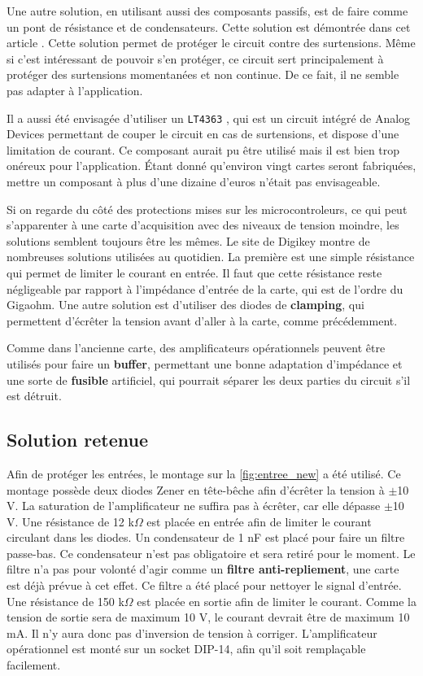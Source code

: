 \documentclass{report}
\begin{document}
Une autre solution, en utilisant aussi des composants passifs, est de faire comme un pont de résistance et de condensateurs. Cette solution est démontrée dans cet article \cite{FilipovaPetrakieva2020}. Cette solution permet de protéger le circuit contre des surtensions. Même si c'est intéressant de pouvoir s'en protéger, ce circuit sert principalement à protéger des surtensions momentanées et non continue. De ce fait, il ne semble pas adapter à l'application.

Il a aussi été envisagée d'utiliser un \verb+LT4363+ \cite{LT4363AD}, qui est un circuit intégré de Analog Devices permettant de couper le circuit en cas de surtensions, et dispose d'une limitation de courant. Ce composant aurait pu être utilisé mais il est bien trop onéreux pour l'application. Étant donné qu'environ vingt cartes seront fabriquées, mettre un composant à plus d'une dizaine d'euros n'était pas envisageable. 

Si on regarde du côté des protections mises sur les microcontroleurs, ce qui peut s'apparenter à une carte d'acquisition avec des niveaux de tension moindre, les solutions semblent toujours être les mêmes. Le site de Digikey \cite{digikey} montre de nombreuses solutions utilisées au quotidien. La première est une simple résistance qui permet de limiter le courant en entrée. Il faut que cette résistance reste négligeable par rapport à l'impédance d'entrée de la carte, qui est de l'ordre du Gigaohm. Une autre solution est d'utiliser des diodes de \textbf{clamping}, qui permettent d'écrêter la tension avant d'aller à la carte, comme précédemment.

Comme dans l'ancienne carte, des amplificateurs opérationnels peuvent être utilisés pour faire un \textbf{buffer}, permettant une bonne adaptation d'impédance et une sorte de \textbf{fusible} artificiel, qui pourrait séparer les deux parties du circuit s'il est détruit.

\subsection{Solution retenue}
Afin de protéger les entrées, le montage sur la  \ref{fig:entree_new} a été utilisé. Ce montage possède deux diodes Zener en tête-bêche afin d'écrêter la tension à $\pm$10 V. La saturation de l'amplificateur ne suffira pas à écrêter, car elle dépasse $\pm$10 V. Une résistance de 12 k$\Omega$ est placée en entrée afin de limiter le courant circulant dans les diodes. Un condensateur de 1 nF est placé pour faire un filtre passe-bas. Ce condensateur n'est pas obligatoire et sera retiré pour le moment. Le filtre n'a pas pour volonté d'agir comme un \textbf{filtre anti-repliement}, une carte est déjà prévue à cet effet. Ce filtre a été placé pour nettoyer le signal d'entrée. Une résistance de 150 k$\Omega$ est placée en sortie afin de limiter le courant. Comme la tension de sortie sera de maximum 10 V, le courant devrait être de maximum 10 mA. Il n'y aura donc pas d'inversion de tension à corriger. L'amplificateur opérationnel est monté sur un socket DIP-14, afin qu'il soit remplaçable facilement.
\end{document}
